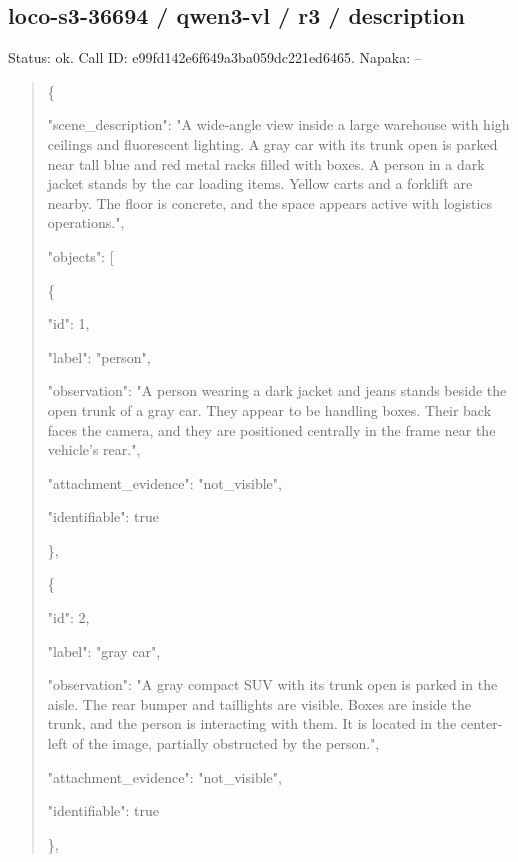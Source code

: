 \documentclass[10pt,a4paper]{article}
\begin{document}
\subsection*{loco-s3-36694 / qwen3-vl / r3 / description}
Status: ok. Call ID: e99fd142e6f649a3ba059dc221ed6465. Napaka: --
\begin{quote}\footnotesize
\{\par
  "scene\_description":\allowbreak{} "A wide-angle view inside a large warehouse with high ceilings and fluorescent lighting. A gray car with its trunk open is parked near tall blue and red metal racks filled with boxes. A person in a dark jacket stands by the car loading items. Yellow carts and a forklift are nearby. The floor is concrete,\allowbreak{} and the space appears active with logistics operations.",\allowbreak{}\par
  "objects":\allowbreak{} [\par
    \{\par
      "id":\allowbreak{} 1,\allowbreak{}\par
      "label":\allowbreak{} "person",\allowbreak{}\par
      "observation":\allowbreak{} "A person wearing a dark jacket and jeans stands beside the open trunk of a gray car. They appear to be handling boxes. Their back faces the camera,\allowbreak{} and they are positioned centrally in the frame near the vehicle's rear.",\allowbreak{}\par
      "attachment\_evidence":\allowbreak{} "not\_visible",\allowbreak{}\par
      "identifiable":\allowbreak{} true\par
    \},\allowbreak{}\par
    \{\par
      "id":\allowbreak{} 2,\allowbreak{}\par
      "label":\allowbreak{} "gray car",\allowbreak{}\par
      "observation":\allowbreak{} "A gray compact SUV with its trunk open is parked in the aisle. The rear bumper and taillights are visible. Boxes are inside the trunk,\allowbreak{} and the person is interacting with them. It is located in the center-left of the image,\allowbreak{} partially obstructed by the person.",\allowbreak{}\par
      "attachment\_evidence":\allowbreak{} "not\_visible",\allowbreak{}\par
      "identifiable":\allowbreak{} true\par
    \},\allowbreak{}\par

\end{quote}
\end{document}
